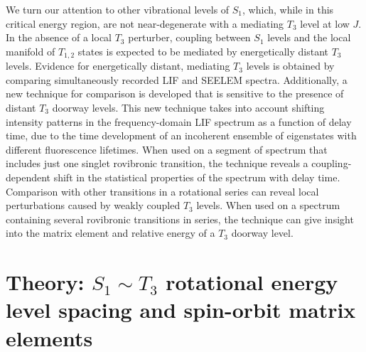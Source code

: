 \documentclass[12pt]{mitthesis}
\begin{document}
We turn our attention to other vibrational levels of $S_1$, which,
while in this critical energy region, are not near-degenerate with a
mediating $T_3$ level at low $J$.  In the absence of a local $T_3$
perturber, coupling between $S_1$ levels and the local manifold of
$T_{1,2}$ states is expected to be mediated by energetically distant
$T_3$ levels.  Evidence for energetically distant, mediating $T_3$
levels is obtained by comparing simultaneously recorded LIF and SEELEM
spectra.  Additionally, a new technique for comparison is developed
that is sensitive to the presence of distant $T_3$ doorway levels.
This new technique takes into account shifting intensity patterns in
the frequency-domain LIF spectrum as a function of delay time, due to
the time development of an incoherent ensemble of eigenstates with
different fluorescence lifetimes.  When used on a segment of spectrum
that includes just one singlet rovibronic transition, the technique
reveals a coupling-dependent shift in the statistical properties of
the spectrum with delay time.  Comparison with other transitions in a
rotational series can reveal local perturbations caused by weakly
coupled $T_3$ levels.  When used on a spectrum containing several
rovibronic transitions in series, the technique can give insight into
the matrix element and relative energy of a $T_3$ doorway level.

\section{Theory: $S_1 \sim T_3$ rotational energy level spacing and
  spin-orbit matrix elements}
\label{theory1}
\end{document}
